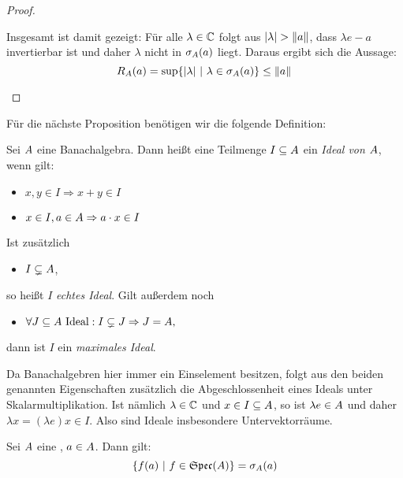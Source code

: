 \begin{proof}
\begin{itemize}
Insgesamt ist damit gezeigt: Für alle $\lambda \in \mathbb{C}$ folgt aus $|\lambda| > \left\lVert a\right\rVert$, dass $\lambda e - a$ invertierbar ist und daher $\lambda$ nicht in $\sigma_A(a)$ liegt. Daraus ergibt sich die Aussage:
	\[R_A(a) = \sup\{|\lambda| ~|~ \lambda \in \sigma_A(a)\} \leq \left\lVert a\right\rVert \qedhere\]
\end{itemize}	
\end{proof}


Für die nächste Proposition benötigen wir die folgende Definition:

\begin{defn}[Ideal] 
Sei $A$ eine Banachalgebra. Dann heißt eine Teilmenge $I \subseteq A$ ein \emph{Ideal von $A$}, wenn gilt:
\begin{itemize}
	\item $x,y \in I \Rightarrow x+y \in I$
	\item $x \in I, a \in A \Rightarrow a \cdot x \in I$
\end{itemize}
Ist zusätzlich
\begin{itemize}
	\item $I \subsetneq A$,
\end{itemize}
so heißt $I$ \emph{echtes Ideal}. Gilt außerdem noch
\begin{itemize}
	\item $\forall J \subseteq A \text{ Ideal}: I \subsetneq J \Rightarrow J = A,$
\end{itemize}
dann ist $I$ ein \emph{maximales Ideal}.
\end{defn}

\begin{bem}
Da Banachalgebren hier immer ein Einselement besitzen, folgt aus den beiden genannten Eigenschaften zusätzlich die Abgeschlossenheit eines Ideals unter Skalarmultiplikation. Ist nämlich $\lambda \in \mathbb{C}$ und $x \in I \subseteq A$, so ist $\lambda e \in A$ und daher $\lambda x = (\lambda e) x \in I$. Also sind Ideale insbesondere Untervektorräume.
\end{bem}

\begin{prop}\label{prop:Spektrum-von-a}
Sei $A$ eine \CAlg, $a \in A$. Dann gilt:
\[ \{f(a) ~|~ f \in \mathfrak{Spec}(A)\} = \sigma_A(a)\]
\end{prop}

